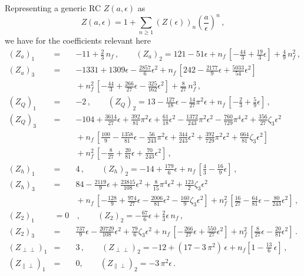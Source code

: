 \documentclass[12pt]{article}
\numberwithin{equation}{section}
\newcommand{\1}[1]{\mathbf{1}^{#1}}
\newcommand{\2}[1]{\mathbf{2}^{#1}}
\newcommand{\3}[1]{\mathbf{3}^{#1}}
\newcommand{\4}[1]{\mathbf{4}^{#1}}
\newcommand{\5}[1]{\mathbf{5}^{#1}}
\newcommand{\EQN}[1]{\hspace{3mm}\fbox{\fbox{$#1$}} \label{#1}}
\newcommand{\mlabel}[1]{ \text{\footnotesize \hspace{3mm}\fbox{\fbox{$#1$}} \label{#1}}}
\renewcommand{\EQN}[1]{\mlabel{#1}}
\renewcommand{\mlabel}[1]{\label{#1}}
\renewcommand{\EQN}[1]{\label{#1}}
\newcommand{\ep}{\epsilon}
\newcommand{\beq}{\begin{equation}}
\newcommand{\eeq}{\end{equation}}
\begin{document}
Representing a generic RC $Z(a,\ep) $ as
\beq
Z(a,\ep) =1+\sum_{n \ge  1}
\left( Z(\ep) \right)_n \left(\frac{a}{\ep}\right)^n
\,,
\eeq
we have for the coefficients relevant here
\begin{eqnarray}
(Z_a)_1&=&
-11+\frac{2}{3}\, n_f\,, 
\qquad
(Z_a)_2=
121-51 \ep+n_f\, \left[-\frac{44}{3}+\frac{19}{3} \ep\right]+\frac{4}{9}\, n_f^2
\,, %
\nonumber\\
(Z_a)_3&=&
-1331+1309 \ep-\frac{2857}{6} \ep^2
+n_f\, \left[242-\frac{2177}{9} \ep+\frac{5033}{54} \ep^2\right]
\nonumber\\
&&{}+n_f^2\, \left[-\frac{44}{3}+\frac{266}{27} \ep-\frac{325}{162} \ep^2\right]+\frac{8}{27}\, n_f^3
\,,  %
\nonumber\\
(Z_Q)_1&=&
-2\,,
\qquad
(Z_Q)_2=
13-\frac{127}{18} \ep-\frac{14}{27} \pi^2 \ep+n_f\, \left[-\frac{2}{3}+\frac{5}{9} \ep\right]
\,, %
\nonumber\\
(Z_Q)_3&=&
-104+\frac{3614}{27} \ep+\frac{392}{81} \pi^2 \ep+\frac{61}{18} \ep^2-\frac{1372}{243} \pi^2 \ep^2-\frac{760}{729} \pi^4 \ep^2+\frac{356}{27}  \zeta_{3} \ep^2
\nonumber\\
&&{}+n_f\, \left[\frac{100}{9}-\frac{1358}{81} \ep-\frac{56}{243} \pi^2 \ep+\frac{344}{243} \ep^2+\frac{392}{729} \pi^2 \ep^2+\frac{664}{81}  \zeta_{3} \ep^2\right]
\nonumber\\
&&{}+n_f^2\, \left[-\frac{8}{27}+\frac{20}{81} \ep+\frac{70}{243} \ep^2\right]
\,, %
\nonumber\\
(Z_h)_1&=&
4\,, 
\qquad
(Z_h)_2=
-14+\frac{179}{6} \ep+n_f\, \left[\frac{4}{3}-\frac{16}{9} \ep\right]
\,,  %
\nonumber\\
(Z_h)_3&=&
84-\frac{2119}{9} \ep+\frac{23815}{108} \ep^2+\frac{8}{15} \pi^4 \ep^2+\frac{123}{2}  \zeta_{3} \ep^2
\nonumber\\
&&{}+n_f\, \left[-\frac{128}{9}+\frac{974}{27} \ep-\frac{2006}{81} \ep^2-\frac{160}{9}  \zeta_{3} \ep^2\right]
+n_f^2\, \left[\frac{16}{27}-\frac{64}{81} \ep-\frac{80}{243} \ep^2\right]
\,, %
\nonumber\\
(Z_2)_1&=0&
\,, 
\qquad
(Z_2)_2=
-\frac{67}{6} \ep+\frac{2}{3} \ep\, n_f
\,, %
\nonumber\\
(Z_2)_3&=&
\frac{737}{9} \ep-\frac{20729}{108} \ep^2+\frac{79}{6}  \zeta_{3} \ep^2
+n_f\, \left[-\frac{266}{27} \ep+\frac{550}{27} \ep^2\right]
+n_f^2\, \left[\frac{8}{27} \ep-\frac{20}{81} \ep^2\right]
\,.\qquad 
\nonumber\\
(Z_{\perp\perp})_1 &=& 3
\,, 
\qquad
(Z_{\perp\perp})_2 = -12 + (17 - 3\,\pi^2)\,\ep +  n_f 
\left[ 1 -\frac{13}{6}\,\ep \right]
\,, %
\nonumber\\
(Z_{\parallel\perp})_1  &=&  0,
\qquad
(Z_{\parallel\perp})_2   =  -3\,  \pi^2 \ep
\,.
\end{eqnarray} 
%
\end{document}
